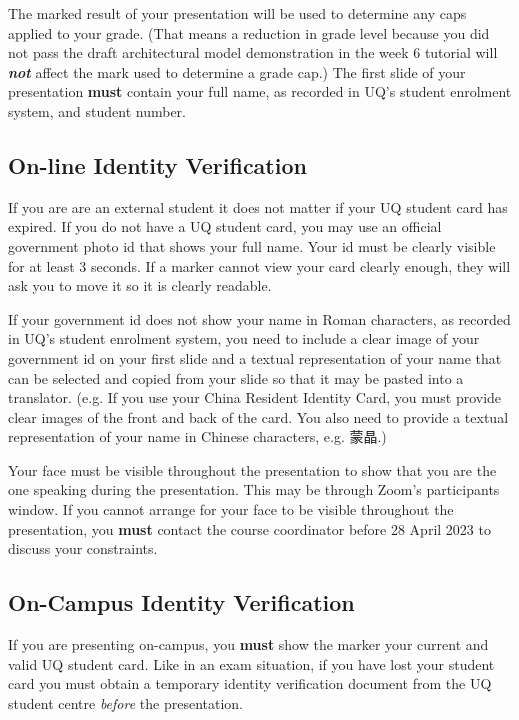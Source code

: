\documentclass{csse4400}
\begin{document}
The marked result of your presentation will be used to determine any caps applied to your grade.
(That means a reduction in grade level because you did not pass the draft architectural model demonstration
in the week 6 tutorial will \textbf{\textit{not}} affect the mark used to determine a grade cap.)
The first slide of your presentation \textbf{must} contain your full name, as recorded in UQ's student enrolment system, and student number.

\subsection{On-line Identity Verification}
If you are are an external student it does not matter if your UQ student card has expired.
If you do not have a UQ student card, you may use an official government photo id that shows your full name.
Your id must be clearly visible for at least 3 seconds.
If a marker cannot view your card clearly enough, they will ask you to move it so it is clearly readable.

\begin{CJK*}{UTF8}{gbsn}
If your government id does not show your name in Roman characters, as recorded in UQ's student enrolment system,
you need to include a clear image of your government id on your first slide and a textual
representation of your name that can be selected and copied from your slide so that it may be pasted into a translator.
(e.g. If you use your China Resident Identity Card, you must provide clear images of the front and back
of the card. You also need to provide a textual representation of your name in Chinese characters, e.g. 蒙晶.)
\end{CJK*}

Your face must be visible throughout the presentation to show that you are the one speaking during the presentation.
This may be through Zoom's participants window.
If you cannot arrange for your face to be visible throughout the presentation,
you \textbf{must} contact the course coordinator before 28 April 2023 to discuss your constraints.

\subsection{On-Campus Identity Verification}
If you are presenting on-campus, you \textbf{must} show the marker your current and valid UQ student card.
Like in an exam situation, if you have lost your student card
you must obtain a temporary identity verification document from the UQ student centre \emph{before} the presentation.
\end{document}
